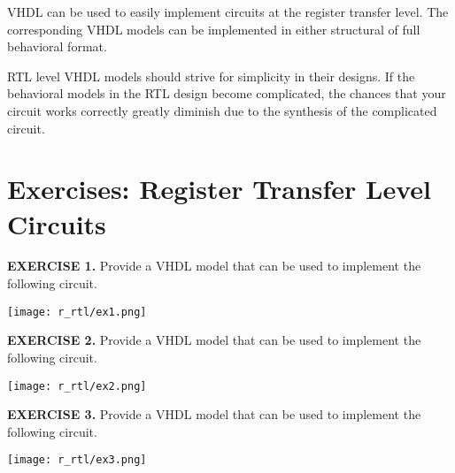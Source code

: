 \begin{my_list}
\item VHDL can be used to easily implement circuits at the register transfer level. The corresponding VHDL models can be implemented in either structural of full behavioral format. 

\item RTL level VHDL models should strive for simplicity in their designs. If the behavioral models in the RTL design become complicated, the chances that your circuit works correctly greatly diminish due to the synthesis of the complicated circuit. 
\end{my_list}

\section{Exercises: Register Transfer Level Circuits}

\vspace{20pt}
\noindent
\begin{minipage}[t]{0.5\textwidth}
\textbf{EXERCISE 1.}
Provide a VHDL model that can be used to implement the following circuit.
\end{minipage}
\begin{minipage}[t]{0.47\textwidth}
\vspace{0pt}\raggedright
\centering
\texttt{[image: r\_rtl/ex1.png]}
\end{minipage}

\vspace{20pt}
\noindent
\begin{minipage}[t]{0.5\textwidth}
\textbf{EXERCISE 2.}
Provide a VHDL model that can be used to implement the following circuit.
\end{minipage}
\begin{minipage}[t]{0.47\textwidth}
\vspace{0pt}\raggedright
\centering
\texttt{[image: r\_rtl/ex2.png]}
\end{minipage}

\vspace{20pt}
\noindent
\begin{minipage}[t]{0.5\textwidth}
\textbf{EXERCISE 3.}
Provide a VHDL model that can be used to implement the following circuit. 
\end{minipage}
\begin{minipage}[t]{0.47\textwidth}
\vspace{0pt}\raggedright
\centering
\texttt{[image: r\_rtl/ex3.png]}
\end{minipage}

